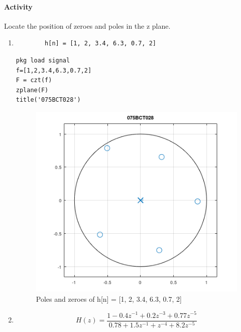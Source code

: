 \documentclass[12pt]{article}
\begin{document}
\paragraph{Activity\\}
Locate the position of zeroes and poles in the z plane.
\begin{enumerate}
    \item \begin{verbatim}
        h[n] = [1, 2, 3.4, 6.3, 0.7, 2]
    \end{verbatim}
    \begin{Verbatim}[frame=single]
pkg load signal
f=[1,2,3.4,6.3,0.7,2]
F = czt(f)
zplane(F)
title('075BCT028')
    \end{Verbatim}
    \begin{figure}[h!]
        \centering
        \includegraphics{labss/Lab5_1.PNG}
        \caption{Poles and zeroes of  h[n] = [1, 2, 3.4, 6.3, 0.7, 2]}
    \end{figure}
    \item \begin{equation}
        H(z) =  \frac{1 - 0.4 z^{-1} + 0.2 z^{-3} + 0.77 z^{-5} }{ 0.78 + 1.5 z^{-1} +z^{-4} + 8.2 z^{-5} } \nonumber
    \end{equation}


\end{enumerate}
\end{document}
